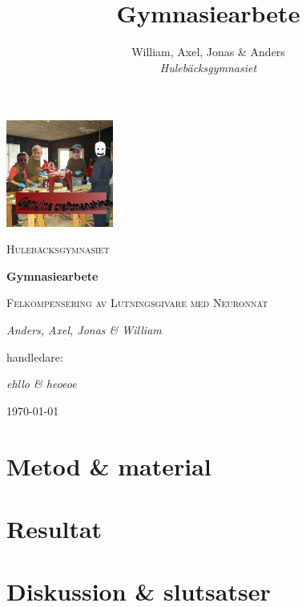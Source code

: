 \documentclass[]{article}
\title{Gymnasiearbete}
\author{William, Axel, Jonas \& Anders \\
\emph{Hulebäcksgymnasiet}}
\begin{document}
\begin{titlepage}
	\centering
	\includegraphics[height=3.5cm]{messengerpicture.png}\par
	\vspace{0.6cm}
	{\scshape\LARGE Hulebäcksgymnasiet}\par
	\vspace{0.5cm}
	{\bfseries\Large Gymnasiearbete}\par
	\vspace{2cm}
	{\scshape\huge Felkompensering av Lutningsgivare med Neuronnät}\par
	\vfill
	{\Large\itshape Anders, Axel, Jonas \& William}\par
	\vspace{0.4cm}
	{\large handledare:\par
	{\itshape ehllo \& heoeoe}}\par
	\vspace{0.4cm}
	{\today\par}
\end{titlepage}

\tableofcontents
\cleardoublepage
{}



\section{Metod \& material}

\section{Resultat}

\section{Diskussion \& slutsatser}
\end{document}
